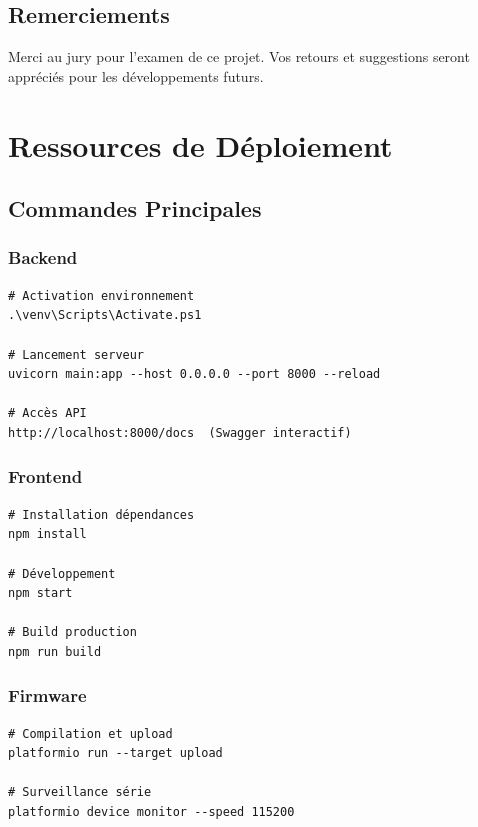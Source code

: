 \documentclass[12pt,french]{report}
\begin{document}
\newpage

\section*{Remerciements}

Merci au jury pour l'examen de ce projet. Vos retours et suggestions seront appréciés pour les développements futurs.

\appendix

\chapter{Ressources de Déploiement}

\section{Commandes Principales}

\subsection{Backend}

\begin{verbatim}
# Activation environnement
.\venv\Scripts\Activate.ps1

# Lancement serveur
uvicorn main:app --host 0.0.0.0 --port 8000 --reload

# Accès API
http://localhost:8000/docs  (Swagger interactif)
\end{verbatim}

\subsection{Frontend}

\begin{verbatim}
# Installation dépendances
npm install

# Développement
npm start

# Build production
npm run build
\end{verbatim}

\subsection{Firmware}

\begin{verbatim}
# Compilation et upload
platformio run --target upload

# Surveillance série
platformio device monitor --speed 115200
\end{verbatim}
\end{document}

